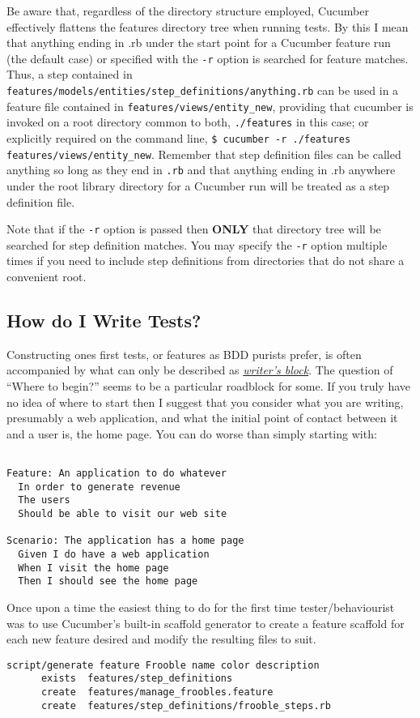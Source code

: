 Be aware that, regardless of the directory structure employed, Cucumber effectively flattens the features directory tree when running tests.  By this I mean that anything ending in .rb under the start point for a Cucumber feature run (the default case) or specified with the \verb+-r+ option is searched for feature matches.  Thus, a step contained in \verb+features/models/entities/step_definitions/anything.rb+ can be used in a feature file contained in \verb+features/views/entity_new+, providing that cucumber is invoked on a root directory common to both, \verb+./features+ in this case; or explicitly required on the command line, \verb+$ cucumber -r ./features features/views/entity_new+.  Remember that step definition files can be called anything so long as they end in \verb+.rb+ and that anything ending in .rb anywhere under the root library directory for a Cucumber run will be treated as a step definition file.

Note that if the \verb+-r+ option is passed then \textbf{ONLY} that directory tree will be searched for step definition matches.  You may specify the \verb+-r+ option multiple times if you need to include step definitions from directories that do not share a convenient root.

\subsection{How do I Write Tests?}

Constructing ones first tests, or features as BDD purists prefer, is often accompanied by what can only be described as \emph{\href{http://en.wikipedia.org/wiki/Writer%27s_block}{writer's block}}.  The question of ``Where to begin?'' seems to be a particular roadblock for some.  If you truly have no idea of where to start then I suggest that you consider what you are writing, presumably a web application, and what the initial point of contact between it and a user is, the home page.  You can do worse than simply starting with:

\begin{verbatim}

Feature: An application to do whatever
  In order to generate revenue
  The users
  Should be able to visit our web site

Scenario: The application has a home page
  Given I do have a web application
  When I visit the home page
  Then I should see the home page

\end{verbatim}
Once upon a time the easiest thing to do for the first time tester/behaviourist was to use Cucumber's built-in scaffold generator to create a feature scaffold for each new feature desired and modify the resulting files to suit.
\begin{verbatim}
script/generate feature Frooble name color description
      exists  features/step_definitions
      create  features/manage_froobles.feature
      create  features/step_definitions/frooble_steps.rb

\end{verbatim}

